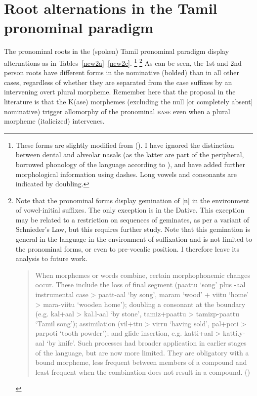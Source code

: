 \documentclass[output=paper]{langscibook}
\begin{document}
\section{Root alternations in the Tamil pronominal paradigm}\label{sec:newell:2}

The pronominal roots in the (spoken) Tamil pronominal paradigm display alternations as in Tables~\ref{new2a}--\ref{new2c}.%
    \footnote{These forms are slightly modified from (\citealt[110]{steever2019dravidian}). I have ignored the distinction between dental and alveolar nasals (as the latter are part of the peripheral, borrowed phonology of the language according to \citeauthor{steever2019dravidian}), and have added further morphological information using dashes. Long vowels and consonants are indicated by doubling.}%
    \footnote{\label{fn:newell:3}Note that the pronominal forms display gemination of [n] in the environment of vowel-initial suffixes. The only exception is in the Dative. This exception may be related to a restriction on sequences of geminates, as per a variant of Schnieder’s Law, but this requires further study. Note that this gemination is general in the language in the environment of suffixation and is not limited to the pronominal forms, or even to pre-vocalic position. I therefore leave its analysis to future work. 
        \begin{quote}
            When morphemes or words combine, certain morphophonemic changes occur. These include the loss of final segment (paattu ‘song’ plus -aal instrumental case > paatt-aal ‘by song’, maram ‘wood’ + viitu ‘home’ > mara-viitu ‘wooden home’); doubling a consonant at the boundary (e.g. kal+aal > kal.l-aal ‘by stone’, tamiz+paattu > tamizp-paattu ‘Tamil song’); assimilation (vil+ttu > virru ‘having sold’, pal+poti > parpoti ‘tooth powder’); and glide insertion, e.g. katti+aal > katti.y-aal ‘by knife’. Such processes had broader application in earlier stages of the language, but are now more limited. They are obligatory with a bound morpheme, less frequent between members of a compound and least frequent when the combination does not result in a compound. \hfill\hbox{(\citealt[103]{steever2019dravidian})}
        \end{quote}
    } 
As can be seen, the 1st and 2nd person roots have different forms in the nominative (bolded) than in all other cases, regardless of whether they are separated from the case suffixes by an intervening overt plural morpheme. Remember here that the proposal in the literature is that the K(ase) morphemes (excluding the null [or completely absent] nominative) trigger allomorphy of the pronominal \textsc{base} even when a plural morpheme (italicized) intervenes.
\end{document}
